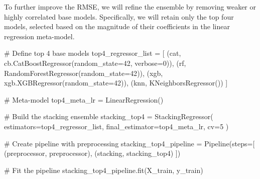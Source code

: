 \documentclass[
  letterpaper,
  DIV=11,
  numbers=noendperiod]{scrreprt}
\newenvironment{Shaded}{\begin{snugshade}}{\end{snugshade}}
\newcommand{\CommentTok}[1]{\textcolor[rgb]{0.37,0.37,0.37}{#1}}
\newcommand{\DecValTok}[1]{\textcolor[rgb]{0.68,0.00,0.00}{#1}}
\newcommand{\NormalTok}[1]{\textcolor[rgb]{0.00,0.23,0.31}{#1}}
\newcommand{\OperatorTok}[1]{\textcolor[rgb]{0.37,0.37,0.37}{#1}}
\newcommand{\StringTok}[1]{\textcolor[rgb]{0.13,0.47,0.30}{#1}}
\begin{document}
To further improve the RMSE, we will refine the ensemble by removing
weaker or highly correlated base models. Specifically, we will retain
only the top four models, selected based on the magnitude of their
coefficients in the linear regression meta-model.

\begin{Shaded}
\begin{Highlighting}[]
\CommentTok{\# Define top 4 base models}
\NormalTok{top4\_regressor\_list }\OperatorTok{=}\NormalTok{ [}
\NormalTok{    (}\StringTok{\textquotesingle{}cat\textquotesingle{}}\NormalTok{, cb.CatBoostRegressor(random\_state}\OperatorTok{=}\DecValTok{42}\NormalTok{, verbose}\OperatorTok{=}\DecValTok{0}\NormalTok{)),}
\NormalTok{    (}\StringTok{\textquotesingle{}rf\textquotesingle{}}\NormalTok{, RandomForestRegressor(random\_state}\OperatorTok{=}\DecValTok{42}\NormalTok{)),}
\NormalTok{    (}\StringTok{\textquotesingle{}xgb\textquotesingle{}}\NormalTok{, xgb.XGBRegressor(random\_state}\OperatorTok{=}\DecValTok{42}\NormalTok{)),}
\NormalTok{    (}\StringTok{\textquotesingle{}knn\textquotesingle{}}\NormalTok{, KNeighborsRegressor())}
\NormalTok{]}

\CommentTok{\# Meta{-}model}
\NormalTok{top4\_meta\_lr }\OperatorTok{=}\NormalTok{ LinearRegression()}

\CommentTok{\# Build the stacking ensemble}
\NormalTok{stacking\_top4 }\OperatorTok{=}\NormalTok{ StackingRegressor(}
\NormalTok{    estimators}\OperatorTok{=}\NormalTok{top4\_regressor\_list,}
\NormalTok{    final\_estimator}\OperatorTok{=}\NormalTok{top4\_meta\_lr,}
\NormalTok{    cv}\OperatorTok{=}\DecValTok{5}
\NormalTok{)}

\CommentTok{\# Create pipeline with preprocessing}
\NormalTok{stacking\_top4\_pipeline }\OperatorTok{=}\NormalTok{ Pipeline(steps}\OperatorTok{=}\NormalTok{[}
\NormalTok{    (}\StringTok{\textquotesingle{}preprocessor\textquotesingle{}}\NormalTok{, preprocessor),}
\NormalTok{    (}\StringTok{\textquotesingle{}stacking\textquotesingle{}}\NormalTok{, stacking\_top4)}
\NormalTok{])}

\CommentTok{\# Fit the pipeline}
\NormalTok{stacking\_top4\_pipeline.fit(X\_train, y\_train)}
\end{Highlighting}
\end{Shaded}
\end{document}
